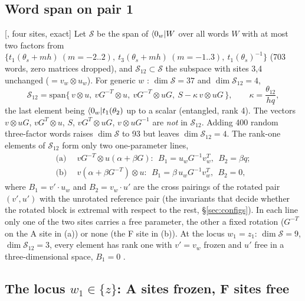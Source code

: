 \subsection{Word span on pair 1}\label{sec:twvac-span}

[, four sites, exact] Let $\mathcal S$ be the span of $\langle0_w|W$ over all words $W$ with at most two factors from
$\{t_1(\theta_s+mh)\ (m=-2..2),\ t_3(\theta_s+mh)\ (m=-1..3),\ t_1(\theta_s)^{-1}\}$ (703 words, zero matrices dropped), and $\mathcal S_{12}\subset\mathcal S$ the
subspace with sites 3,4 unchanged ($=v_w\otimes u_w$). For generic $w$ \ex: $\dim\mathcal S=37$ and $\dim\mathcal S_{12}=4$,
\begin{equation}
 \mathcal S_{12}=\mathrm{span}\{\,v\otimes u,\ vG^{-T}\otimes u,\ vG^{-T}\otimes uG,\ S-\kappa\,v\otimes uG\,\},\qquad \kappa=\frac{\theta_{12}}{hq},
\end{equation}
the last element being $\langle0_w|t_1(\theta_2)$ up to a scalar (entangled, rank 4). The vectors $v\otimes uG$, $vG^T\otimes u$, $S$, $vG^T\otimes uG$, $v\otimes uG^{-1}$ are \emph{not} in $\mathcal S_{12}$.
Adding 400 random three-factor words raises $\dim\mathcal S$ to 93 but leaves $\dim\mathcal S_{12}=4$. The rank-one elements of $\mathcal S_{12}$ form only two one-parameter lines,
\begin{align}
 \text{(a)}\ \ &vG^{-T}\otimes u(\alpha+\beta G):\ \ B_1=u_wG^{-1}v_w^T,\ \ B_2=\beta q;\nonumber\\
 \text{(b)}\ \ &v(\alpha+\beta G^{-T})\otimes u:\ \ B_1=\beta\,u_wG^{-1}v_w^T,\ \ B_2=0,
\end{align}
where $B_1=v'\cdot u_w$ and $B_2=v_w\cdot u'$ are the cross pairings of the rotated pair $(v',u')$ with the unrotated reference pair (the invariants that decide whether the
rotated block is extremal with respect to the rest, \S\ref{sec:configs}). In each line only one of the two sites carries a free parameter, the other a fixed rotation ($G^{-T}$ on the A site in (a)) or none (the F site in (b)). At the locus $w_1=z_1$: $\dim\mathcal S=9$,
$\dim\mathcal S_{12}=3$, every element has rank one with $v'=v_w$ frozen and $u'$ free in a three-dimensional space, $B_1=0$ \ex.

\subsection{The locus \texorpdfstring{$w_1\in\{z\}$}{w\_1 in {z}}: A sites frozen, F sites free}\label{sec:twvac-locus}


